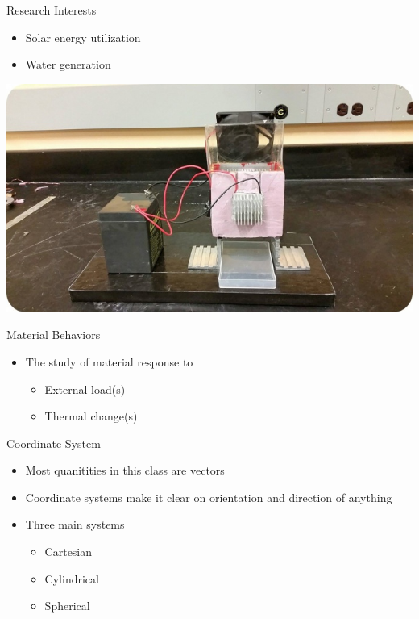 \documentclass[10pt, svgnames]{beamer}
\begin{document}
\begin{frame}[label={sec:org2fd3992}]{Research Interests}
\begin{itemize}
\item Solar energy utilization

\item Water generation
\end{itemize}

\begin{center}
\includegraphics[width=.9\linewidth]{pictures/awg.jpg}
\end{center}
\end{frame}

\begin{frame}[label={sec:org9fcc7cc}]{Material Behaviors}
\begin{itemize}
\item The study of material response to

\begin{itemize}
\item External load(s)

\item Thermal change(s)
\end{itemize}
\end{itemize}
\end{frame}

\begin{frame}[label={sec:orgd5319fb}]{Coordinate System}
\begin{itemize}
\item Most quanitities in this class are vectors

\item Coordinate systems make it clear on orientation and direction of
anything

\item Three main systems

\begin{itemize}
\item Cartesian

\item Cylindrical

\item Spherical
\end{itemize}
\end{itemize}
\end{frame}
\end{document}
